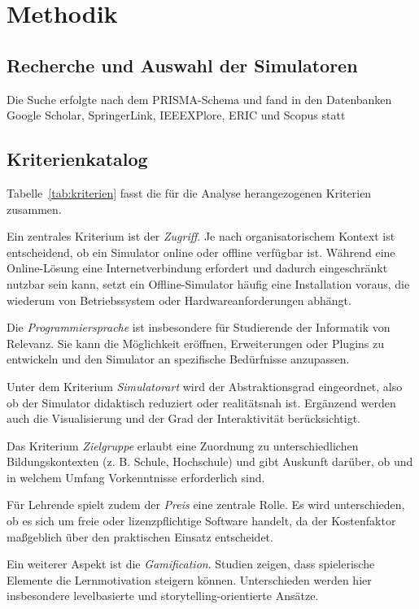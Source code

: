 \chapter{Methodik}

\section{Recherche und Auswahl der Simulatoren}

Die Suche erfolgte nach dem PRISMA-Schema und fand in den Datenbanken Google Scholar,
SpringerLink, IEEEXPlore, ERIC und Scopus statt

\section{Kriterienkatalog}

Tabelle~\ref{tab:kriterien} fasst die für die Analyse herangezogenen Kriterien zusammen.

Ein zentrales Kriterium ist der \textit{Zugriff}. Je nach organisatorischem Kontext ist entscheidend, ob ein Simulator online oder offline verfügbar ist. Während eine Online-Lösung eine Internetverbindung erfordert und dadurch eingeschränkt nutzbar sein kann, setzt ein Offline-Simulator häufig eine Installation voraus, die wiederum von Betriebssystem oder Hardwareanforderungen abhängt.

Die \textit{Programmiersprache} ist insbesondere für Studierende der Informatik von Relevanz. Sie kann die Möglichkeit eröffnen, Erweiterungen oder Plugins zu entwickeln und den Simulator an spezifische Bedürfnisse anzupassen.

Unter dem Kriterium \textit{Simulatorart} wird der Abstraktionsgrad eingeordnet, also ob der Simulator didaktisch reduziert oder realitätsnah ist. Ergänzend werden auch die Visualisierung und der Grad der Interaktivität berücksichtigt.

Das Kriterium \textit{Zielgruppe} erlaubt eine Zuordnung zu unterschiedlichen Bildungskontexten (z. B. Schule, Hochschule) und gibt Auskunft darüber, ob und in welchem Umfang Vorkenntnisse erforderlich sind.

Für Lehrende spielt zudem der \textit{Preis} eine zentrale Rolle. Es wird unterschieden, ob es sich um freie oder lizenzpflichtige Software handelt, da der Kostenfaktor maßgeblich über den praktischen Einsatz entscheidet.

Ein weiterer Aspekt ist die \textit{Gamification}. Studien zeigen, dass spielerische Elemente die Lernmotivation steigern können. Unterschieden werden hier insbesondere levelbasierte und storytelling-orientierte Ansätze.\parencite[S. 106f]{sailer_gamification_2020}\parencite[S. 13]{baah_enhancing_2024}

